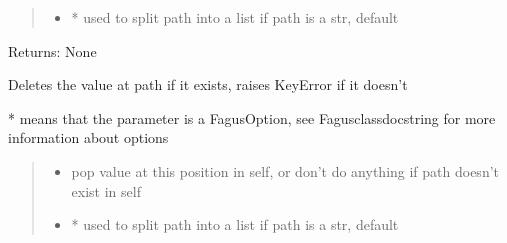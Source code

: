 \documentclass[a4paper,10pt,english]{sphinxmanual}
\begin{document}
\begin{fulllineitems}
\begin{fulllineitems}
\begin{quote}
\begin{description}
\begin{itemize}
\item {}
\sphinxAtStartPar
{} \textendash{} * used to split path into a list if path is a str, default 

\end{itemize}

\end{description}\end{quote}

\sphinxAtStartPar
Returns: None

\end{fulllineitems}


\begin{fulllineitems}
\label{\detokenize{fagus:fagus.Fagus.remove}}
\pysigstartsignatures
{}
\pysigstopsignatures
\sphinxAtStartPar
Deletes the value at path if it exists, raises KeyError if it doesn’t

\sphinxAtStartPar
* means that the parameter is a FagusOption, see Fagus\sphinxhyphen{}class\sphinxhyphen{}docstring for more information about options
\begin{quote}\begin{description}
\begin{itemize}
\item {}
\sphinxAtStartPar
{} \textendash{} pop value at this position in self, or don’t do anything if path doesn’t exist in self

\item {}
\sphinxAtStartPar
{} \textendash{} * used to split path into a list if path is a str, default 

\end{itemize}

\end{description}\end{quote}


\end{fulllineitems}
\end{fulllineitems}
\end{document}
